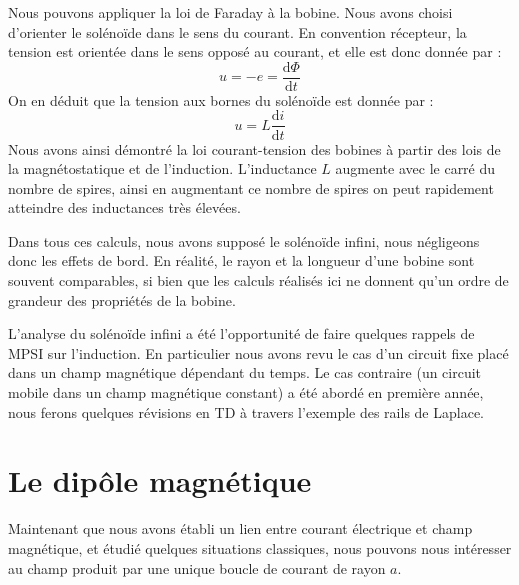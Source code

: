 \documentclass[11pt,fleqn]{book} %
\newcommand{\dd}{\mathrm{d}}
\begin{document}
Nous pouvons appliquer la loi de Faraday à la bobine. Nous avons choisi d'orienter le solénoïde dans le sens du courant. En convention récepteur, la tension est orientée dans le sens opposé au courant, et elle est donc donnée par :
\begin{equation}
    u = -e = \frac{\dd \Phi}{\dd t}
\end{equation}
On en déduit que la tension aux bornes du solénoïde est donnée par :
\begin{equation}
    u = L \frac{\dd i}{\dd t}
\end{equation}
Nous avons ainsi démontré la loi courant-tension des bobines à partir des lois de la magnétostatique et de l'induction. L'inductance $L$ augmente avec le carré du nombre de spires, ainsi en augmentant ce nombre de spires on peut rapidement atteindre des inductances très élevées.

\begin{remark}
    Dans tous ces calculs, nous avons supposé le solénoïde infini, nous négligeons donc les effets de bord. En réalité, le rayon et la longueur d'une bobine sont souvent comparables, si bien que les calculs réalisés ici ne donnent qu'un ordre de grandeur des propriétés de la bobine.
\end{remark}

\begin{remark}
    L'analyse du solénoïde infini a été l'opportunité de faire quelques rappels de MPSI sur l'induction. En particulier nous avons revu le cas d'un circuit fixe placé dans un champ magnétique dépendant du temps. Le cas contraire (un circuit mobile dans un champ magnétique constant) a été abordé en première année, nous ferons quelques révisions en TD à travers l'exemple des rails de Laplace.
\end{remark}


\section{Le dipôle magnétique}

Maintenant que nous avons établi un lien entre courant électrique et champ magnétique, et étudié quelques situations classiques, nous pouvons nous intéresser au champ produit par une unique boucle de courant de rayon $a$.
\end{document}
